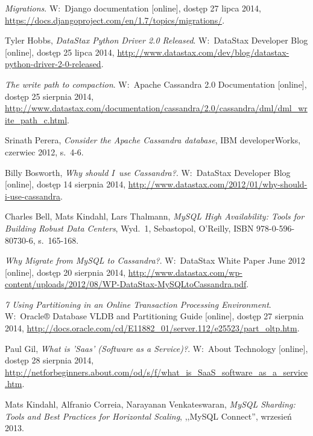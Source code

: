 \begin{thebibliography}{9}
\emph{Migrations}. W:~Django documentation [online], dostęp 27 lipca 2014, \url{https://docs.djangoproject.com/en/1.7/topics/migrations/}.

Tyler Hobbs, \emph{DataStax Python Driver 2.0 Released}. W:~DataStax Developer Blog [online], dostęp 25 lipca 2014, \url{http://www.datastax.com/dev/blog/datastax-python-driver-2-0-released}.

\emph{The write path to compaction}. W:~Apache Cassandra 2.0 Documentation [online], dostęp 25 sierpnia 2014, \url{http://www.datastax.com/documentation/cassandra/2.0/cassandra/dml/dml\_write\_path\_c.html}.

Srinath Perera, \emph{Consider the Apache Cassandra database}, IBM developerWorks, czerwiec 2012, s.~4-6.

Billy Bosworth, \emph{Why should I~use Cassandra?}. W:~DataStax Developer Blog [online], dostęp 14 sierpnia 2014, \url{http://www.datastax.com/2012/01/why-should-i-use-cassandra}.

Charles Bell, Mats Kindahl, Lars Thalmann, \emph{MySQL High Availability: Tools for Building Robust Data Centers}, Wyd.~1, Sebastopol, O'Reilly, ISBN 978-0-596-80730-6, s.~165-168.

\emph{Why Migrate from MySQL to Cassandra?}. W:~DataStax White Paper June 2012 [online], dostęp 20 sierpnia 2014, \url{http://www.datastax.com/wp-content/uploads/2012/08/WP-DataStax-MySQLtoCassandra.pdf}.

\emph{7 Using Partitioning in an Online Transaction Processing Environment}. W:~Oracle® Database VLDB and Partitioning Guide [online], dostęp 27 sierpnia 2014, \url{http://docs.oracle.com/cd/E11882\_01/server.112/e25523/part\_oltp.htm}.

Paul Gil, \emph{What is 'Saas' (Software as a Service)?}. W:~About Technology [online], dostęp 28 sierpnia 2014, \url{http://netforbeginners.about.com/od/s/f/what\_is\_SaaS\_software\_as\_a\_service.htm}.

Mats Kindahl, Alfranio Correia, Narayanan Venkateswaran, \emph{MySQL Sharding: Tools and Best Practices for Horizontal Scaling}, ,,MySQL Connect'', wrzesień 2013.

\end{thebibliography}
